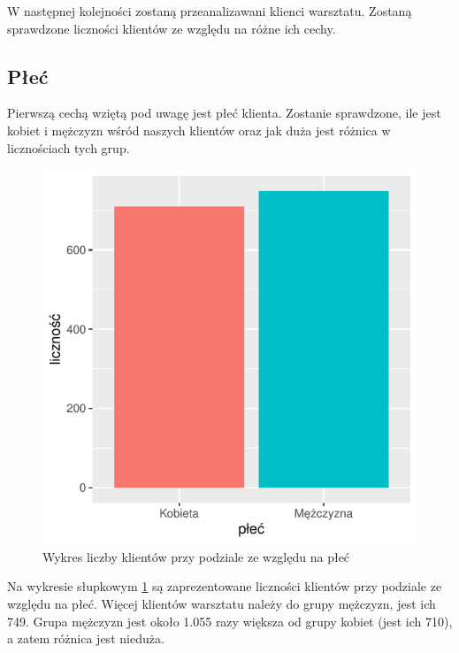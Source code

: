 \documentclass{article}\usepackage[]{graphicx}\usepackage[]{xcolor}
\makeatletter
\def\maxwidth{ %
  \ifdim\Gin@nat@width>\linewidth
    \linewidth
  \else
    \Gin@nat@width
  \fi
}
\newenvironment{knitrout}{}{} %
\makeatother
\begin{document}
W następnej kolejności zostaną przeanalizawani klienci warsztatu. Zostaną sprawdzone liczności klientów ze względu na różne ich cechy.

\subsection{Płeć}

Pierwszą cechą wziętą pod uwagę jest płeć klienta. Zostanie sprawdzone, ile jest kobiet i mężczyzn wśród naszych klientów oraz jak duża jest różnica w licznościach tych grup.

\begin{knitrout}
\color{fgcolor}\begin{figure}[H]

{\centering \includegraphics[width=\maxwidth]{figure/fig_plec-1} 

}

\caption[Wykres liczby klientów przy podziale ze względu na płeć]{Wykres liczby klientów przy podziale ze względu na płeć}\label{fig:fig_plec}
\end{figure}

\end{knitrout}

Na wykresie słupkowym \ref{fig:fig_plec} są zaprezentowane liczności klientów przy podziale ze względu na płeć. Więcej klientów warsztatu należy do grupy mężczyzn, jest ich 749. Grupa mężczyzn jest około 1.055
razy większa od grupy kobiet (jest ich 710), a zatem różnica jest nieduża.
\end{document}
